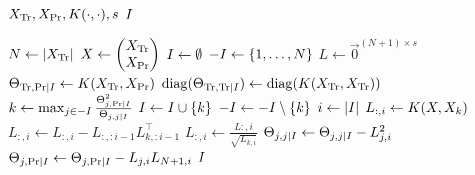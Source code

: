 \begin{algorithmic}[1]
  \REQUIRE \( X_{\text{Tr}}, X_{\text{Pr}}, K(\cdot, \cdot), s \)
  \ENSURE \( I \)

  \STATE \( N \gets \lvert X_{\text{Tr}} \rvert \)
  \STATE \(
    X \gets
    \begin{pmatrix}
      X_{\text{Tr}} \\
      X_{\text{Pr}}
    \end{pmatrix}
  \)
  \STATE \( I \gets \emptyset \)
  \STATE \( -I \gets \{ 1, \dotsc, N \} \)
  \STATE \( L \gets \vec{0}^{(N + 1) \times s} \)
  \STATE \(
    \Theta_{\text{Tr}, \text{Pr} \mid I} \gets
    K(X_{\text{Tr}}, X_{\text{Pr}})
  \)
  \STATE \(
    \operatorname{diag}(\Theta_{\text{Tr}, \text{Tr} \mid I}) \gets
    \operatorname{diag}(K(X_{\text{Tr}}, X_{\text{Tr}}))
  \)
    \STATE \(
      k \gets \max_{j \in -I}
      \frac{\Theta_{j, \text{Pr} \mid I}^2}{\Theta_{j, j \mid I}}
    \)
    \STATE \( I \gets I \cup \{ k \} \)
    \STATE \( -I \gets -I \setminus \{ k \} \)
    \STATE \( i \gets \lvert I\rvert \)
    \STATE \( L_{:, i} \gets K(X, X_k) \)
    \STATE \( L_{:, i} \gets L_{:, i} - L_{:, :i - 1} L_{k, :i - 1}^{\top} \)
    \STATE \( L_{:, i} \gets \frac{L{:, i}}{\sqrt{L_{k, i}}} \)
      \STATE \(
        \Theta_{j, j \mid I} \gets
        \Theta_{j, j \mid I} -
        L_{j, i}^2
      \)
      \STATE \(
        \Theta_{j, \text{Pr} \mid I} \gets
        \Theta_{j, \text{Pr} \mid I} -
        L_{j, i} L_{N + 1, i}
      \)
    \ENDFOR
  \ENDWHILE
  \RETURN \( I \)
\end{algorithmic}
